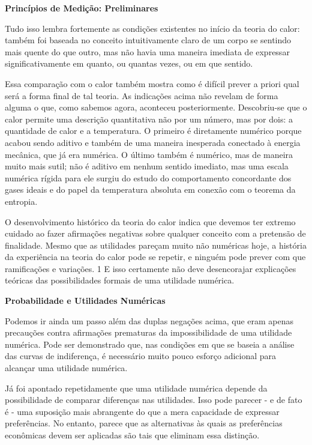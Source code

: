 \documentclass[12pt]{article}
\begin{document}
\textbf{Princípios de Medição: Preliminares}

Tudo isso lembra fortemente as condições existentes no início da teoria do calor: também foi baseada no conceito intuitivamente claro de um corpo se sentindo mais quente do que outro, mas não havia uma maneira imediata de expressar significativamente em quanto, ou quantas vezes, ou em que sentido.

Essa comparação com o calor também mostra como é difícil prever a priori qual será a forma final de tal teoria. As indicações acima não revelam de forma alguma o que, como sabemos agora, aconteceu posteriormente. Descobriu-se que o calor permite uma descrição quantitativa não por um número, mas por dois: a quantidade de calor e a temperatura. O primeiro é diretamente numérico porque acabou sendo aditivo e também de uma maneira inesperada conectado à energia mecânica, que já era numérica. O último também é numérico, mas de maneira muito mais sutil; não é aditivo em nenhum sentido imediato, mas uma escala numérica rígida para ele surgiu do estudo do comportamento concordante dos gases ideais e do papel da temperatura absoluta em conexão com o teorema da entropia.

O desenvolvimento histórico da teoria do calor indica que devemos ter extremo cuidado ao fazer afirmações negativas sobre qualquer conceito com a pretensão de finalidade. Mesmo que as utilidades pareçam muito não numéricas hoje, a história da experiência na teoria do calor pode se repetir, e ninguém pode prever com que ramificações e variações. 1 E isso certamente não deve desencorajar explicações teóricas das possibilidades formais de uma utilidade numérica.

\textbf{Probabilidade e Utilidades Numéricas}

Podemos ir ainda um passo além das duplas negações acima, que eram apenas precauções contra afirmações prematuras da impossibilidade de uma utilidade numérica. Pode ser demonstrado que, nas condições em que se baseia a análise das curvas de indiferença, é necessário muito pouco esforço adicional para alcançar uma utilidade numérica.

Já foi apontado repetidamente que uma utilidade numérica depende da possibilidade de comparar diferenças nas utilidades. Isso pode parecer - e de fato é - uma suposição mais abrangente do que a mera capacidade de expressar preferências. No entanto, parece que as alternativas às quais as preferências econômicas devem ser aplicadas são tais que eliminam essa distinção.
\end{document}
